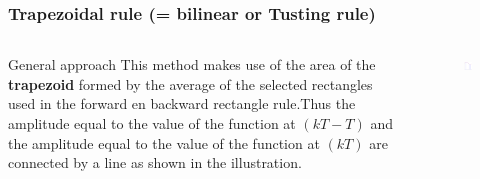 \begin{frame}
	\frametitle{Trapezoidal rule (= bilinear or Tusting rule)}
	
\begin{columns}
	\begin{column}{0.5\textwidth}
		\begin{block}{General approach}
			This method makes use of the area of the \textbf{trapezoid} formed by the average of the selected rectangles used in the forward en backward rectangle rule.Thus the amplitude equal to the value of the function at $(kT - T)$ and the amplitude equal to the value of the function at $(kT)$ are connected by a line as shown in the illustration.
		\end{block}	
	\end{column}

	\begin{column}{0.5\textwidth}
		\begin{figure}
			\centering
			\includegraphics[width=1\linewidth]{Trapezium}
		\end{figure}
	\end{column}	
	
\end{columns}
\end{frame}

